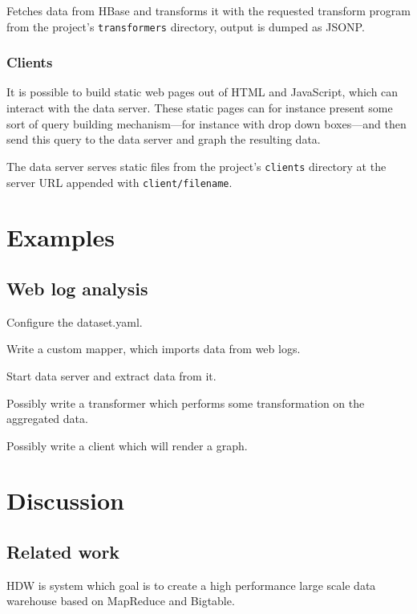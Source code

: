 \documentclass[a4paper,10pt]{book}
\begin{document}
Fetches data from HBase and transforms it with the requested transform
program from the project's \texttt{transformers} directory, output is
dumped as JSONP.


\subsection{Clients}

It is possible to build static web pages out of HTML and JavaScript, which
can interact with the data server. These static pages can for instance
present some sort of query building mechanism---for instance with drop down
boxes---and then send this query to the data server and graph the resulting
data.

The data server serves static files from the project's \texttt{clients}
directory at the server URL appended with \texttt{client/filename}.



\chapter{Examples}

\section{Web log analysis}

Configure the dataset.yaml.

Write a custom mapper, which imports data from web logs.

Start data server and extract data from it.

Possibly write a transformer which performs some transformation on the
aggregated data.

Possibly write a client which will render a graph.



\chapter{Discussion}

\section{Related work}

HDW is system which goal is to create a high performance large scale data
warehouse based on MapReduce and Bigtable. \cite{hdw}
\end{document}

